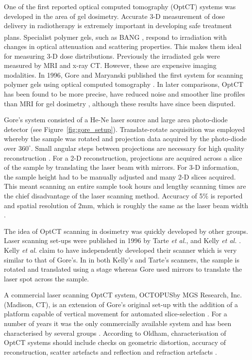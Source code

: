 One of the first reported optical computed tomography (OptCT) systems was developed in the area of gel dosimetry. Accurate 3-D measurement of dose delivery in radiotherapy is extremely important in developing safe treatment plans. Specialist polymer gels, such as BANG\textsuperscript{\textregistered} \cite{Maryanski:1996}, respond to irradiation with changes in optical attenuation and scattering properties.  This makes them ideal for measuring 3-D dose distributions. Previously the irradiated gels were measured by MRI and x-ray CT. However, these are expensive imaging modalities. In 1996, Gore and Maryanski published the first system for scanning polymer gels using optical computed tomography \cite{Gore:1999tg}. In later comparisons, OptCT has been found to be more precise, have reduced noise and smoother line profiles than MRI for gel dosimetry \cite{Oldham:2001gs}, although these results have since been disputed. 

Gore's system consisted of a  He-Ne laser source and large area photo-diode detector (see Figure~\ref{fig:gore_setup}). Translate-rotate acquisition was employed whereby the sample was rotated and projection data  acquired  by the photo-diode over $360^{\circ}$. Small angular steps between projections are necessary for high quality reconstruction \cite{russ2002image}. For a 2-D reconstruction, projections are acquired across a slice of the sample by translating the laser beam with mirrors. For 3-D information, the sample height  had to be manually adjusted and many 2-D slices acquired. This meant scanning an entire sample took  hours and lengthy scanning times are the chief disadvantage of the laser scanning method.  Accuracy of 5\% is reported and spatial resolution of 2mm, which is roughly the same as the laser beam width \cite{Gore:1999tg}.

The idea of OptCT scanning in dosimetry was quickly developed by other groups. Laser scanning set-ups were published in 1996 by Tarte \textit{et al.},  \cite{Tarte:2006} and Kelly \textit{et al.}  \cite{Kelly:1998}.
Kelly \textit{et al.} claim to have independently developed their scanner which is very similar to that of Gore's. In in both Kelly's and Tarte's  scanners, the sample is rotated and translated using a stage whereas Gore used mirrors to translate the laser spot across the sample. 


A commercial laser scanning OptCT system, OCTOPUS\texttrademark by MGS Research, Inc.
(Madison, CT),  is an extension of Gore's original set-up with the addition of a platform capable of vertical movement for automated slice-selection \cite{Islam:2003gs}. For a number of years it was the only commercially available system and has been characterised by several groups \cite{Xu:2003cc, Islam:2003gs, Xu:2004iv, Sakhalkar:2009hb}. According to Oldham, characterisation of OptCT systems should include checks on geometric distortion, accuracy of reconstruction, scatter artefacts and reflection and refraction artefacts \cite{Oldham:2004cj}.


